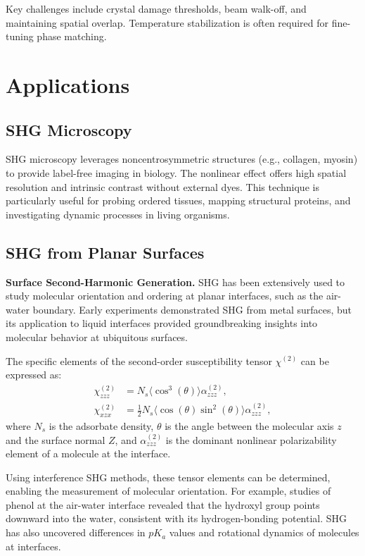 \documentclass[9pt,a4paper,twocolumn,twoside]{tau-class/tau}
\begin{document}
Key challenges include crystal damage thresholds, beam walk-off, and maintaining spatial overlap. Temperature stabilization is often required for fine-tuning phase matching.

\section{Applications}
\subsection{SHG Microscopy}
SHG microscopy leverages noncentrosymmetric structures (e.g., collagen, myosin) to provide label-free imaging in biology. The nonlinear effect offers high spatial resolution and intrinsic contrast without external dyes. This technique is particularly useful for probing ordered tissues, mapping structural proteins, and investigating dynamic processes in living organisms.

\subsection{SHG from Planar Surfaces}
\textbf{Surface Second-Harmonic Generation.} SHG has been extensively used to study molecular orientation and ordering at planar interfaces, such as the air-water boundary. Early experiments demonstrated SHG from metal surfaces, but its application to liquid interfaces provided groundbreaking insights into molecular behavior at ubiquitous surfaces.

The specific elements of the second-order susceptibility tensor $\chi^{(2)}$ can be expressed as:
\begin{align}
\chi_{zzz}^{(2)} &= N_s \langle \cos^3(\theta) \rangle \alpha_{zzz}^{(2)}, \\
\chi_{xzx}^{(2)} &= \frac{1}{2} N_s \langle \cos(\theta) \sin^2(\theta) \rangle \alpha_{zzz}^{(2)},
\end{align}
where $N_s$ is the adsorbate density, $\theta$ is the angle between the molecular axis $z$ and the surface normal $Z$, and $\alpha_{zzz}^{(2)}$ is the dominant nonlinear polarizability element of a molecule at the interface. \cite{SecondHarmonicGeneration}

Using interference SHG methods, these tensor elements can be determined, enabling the measurement of molecular orientation. For example, studies of phenol at the air-water interface revealed that the hydroxyl group points downward into the water, consistent with its hydrogen-bonding potential. SHG has also uncovered differences in $pK_a$ values and rotational dynamics of molecules at interfaces.
\end{document}
